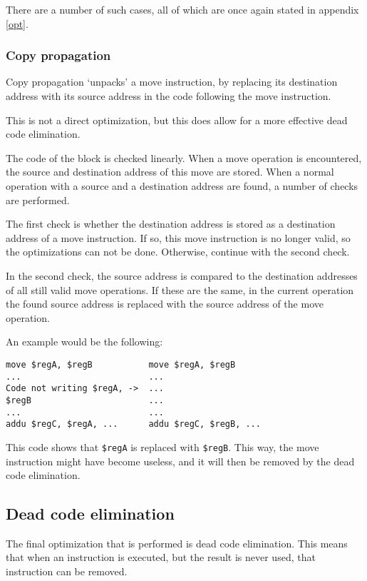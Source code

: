 \documentclass[10pt,a4paper]{article}
\begin{document}
There are a number of such cases, all of which are once again stated in
appendix \ref{opt}.

\subsubsection*{Copy propagation}

Copy propagation `unpacks' a move instruction, by replacing its destination
address with its source address in the code following the move instruction.

This is not a direct optimization, but this does allow for a more effective
dead code elimination.

The code of the block is checked linearly. When a move operation is
encountered, the source and destination address of this move are stored. When
a normal operation with a source and a destination address are found, a number
of checks are performed.

The first check is whether the destination address is stored as a destination
address of a move instruction. If so, this move instruction is no longer valid,
so the optimizations can not be done. Otherwise, continue with the second
check.

In the second check, the source address is compared to the destination
addresses of all still valid move operations. If these are the same, in the
current operation the found source address is replaced with the source address
of the move operation.

An example would be the following:
\begin{verbatim}
move $regA, $regB           move $regA, $regB
...                         ...
Code not writing $regA, ->  ...
$regB                       ...
...                         ...
addu $regC, $regA, ...      addu $regC, $regB, ...
\end{verbatim}
This code shows that \texttt{\$regA} is replaced with \texttt{\$regB}. This
way, the move instruction might have become useless, and it will then be
removed by the dead code elimination.

\subsection{Dead code elimination}

The final optimization that is performed is dead code elimination. This means
that when an instruction is executed, but the result is never used, that
instruction can be removed.
\end{document}
